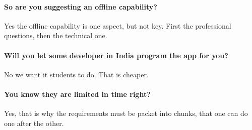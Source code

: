 \paragraph{So are you suggesting an offline capability?} Yes the offline capability is one aspect, but not key. First the professional questions, then the technical one.

\paragraph{Will you let some developer in India program the app for you?} No we want it students to do. That is cheaper.

\paragraph{You know they are limited in time right?} Yes, that is why the requirements must be packet into chunks, that one can do one after the other.

